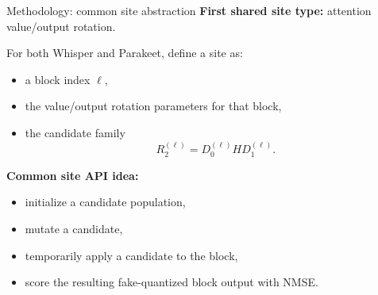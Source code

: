 \documentclass[aspectratio=169,11pt]{beamer}
\begin{document}
\begin{frame}{Methodology: common site abstraction}
\textbf{First shared site type:} attention value/output rotation.

\vspace{0.2cm}
For both Whisper and Parakeet, define a site as:
\begin{itemize}
  \item a block index $\ell$,
  \item the value/output rotation parameters for that block,
  \item the candidate family
  \[
  R_2^{(\ell)} = D_0^{(\ell)} H D_1^{(\ell)}.
  \]
\end{itemize}

\vspace{0.2cm}
\textbf{Common site API idea:}
\begin{itemize}
  \item initialize a candidate population,
  \item mutate a candidate,
  \item temporarily apply a candidate to the block,
  \item score the resulting fake-quantized block output with NMSE.
\end{itemize}
\end{frame}
\end{document}
